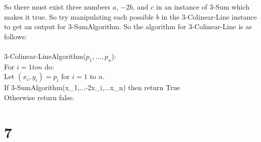 \documentclass[letterpaper,notitlepage,twoside]{article}
\newcommand\tab[1][1cm]{\hspace*{#1}} %
\begin{document}
So there must exist three numbers $a$, $-2b$, and $c$ in an instance of 3-Sum which makes it true. So try manipulating each possible $b$ in the 3-Colinear-Line instance to get an output for 3-SumAlgorithm. So the algorithm for 3-Colinear-Line is as follows:
\\\\
3-Colinear-LineAlgorithm($p_1,...,p_n$):\\
\tab For $i = 1 to n$ do:\\
\tab\tab Let $(x_i, y_i) = p_i$ for $i = 1$ to $n$.\\
\tab\tab If 3-SumAlgorithm(x_1,...-2x_i,...x_n) then return True\\
\tab Otherwise return false.

\section*{7}
\end{document}

